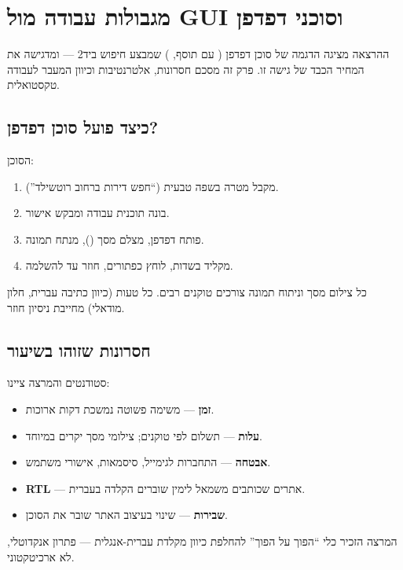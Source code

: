 \section{מגבולות עבודה מול GUI וסוכני דפדפן}

ההרצאה מציגה הדגמה של סוכן דפדפן ( עם תוסף, )
שמבצע חיפוש ביד2 --- ומדגישה את המחיר הכבד של גישה זו. פרק זה מסכם
חסרונות, אלטרנטיבות וכיוון המעבר לעבודה טקסטואלית.



\subsection{כיצד פועל סוכן דפדפן?}

הסוכן:
\begin{enumerate}[rightmargin=2em]
  \item מקבל מטרה בשפה טבעית (``חפש דירות ברחוב רוטשילד'').
  \item בונה תוכנית עבודה ומבקש אישור.
  \item פותח דפדפן, מצלם מסך (), מנתח תמונה.
  \item מקליד בשדות, לוחץ כפתורים, חוזר עד להשלמה.
\end{enumerate}

כל צילום מסך וניתוח תמונה צורכים טוקנים רבים. כל טעות  (כיוון
כתיבה עברית, חלון מודאלי) מחייבת ניסיון חוזר.

\subsection{חסרונות שזוהו בשיעור}

סטודנטים והמרצה ציינו:
\begin{itemize}[rightmargin=2em]
  \item \textbf{זמן} --- משימה פשוטה נמשכת דקות ארוכות.
  \item \textbf{עלות} --- תשלום לפי טוקנים; צילומי מסך יקרים במיוחד.
  \item \textbf{אבטחה} --- התחברות לגימייל, סיסמאות, אישורי משתמש.
  \item \textbf{RTL} --- אתרים שכותבים משמאל לימין שוברים הקלדה בעברית.
  \item \textbf{שבירות} --- שינוי בעיצוב האתר שובר את הסוכן.
\end{itemize}

\begin{notebox}
המרצה הזכיר כלי ``הפוך על הפוך'' להחלפת כיוון מקלדת עברית-אנגלית ---
פתרון אנקדוטלי, לא ארכיטקטוני.
\end{notebox}

